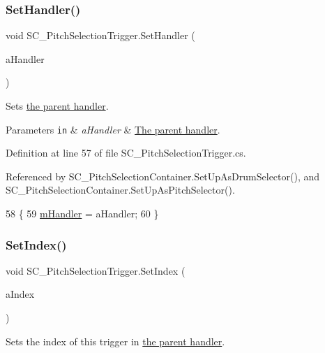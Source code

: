 \subsubsection{\texorpdfstring{Set\+Handler()}{SetHandler()}}
{\footnotesize\ttfamily void S\+C\+\_\+\+Pitch\+Selection\+Trigger.\+Set\+Handler (\begin{DoxyParamCaption}\item[{\hyperlink{class_s_c___pitch_selection_container}{S\+C\+\_\+\+Pitch\+Selection\+Container}}]{a\+Handler }\end{DoxyParamCaption})}



Sets \hyperlink{group___doc_s_c___p_s_c}{the parent handler}. 


\begin{DoxyParams}[1]{Parameters}
\mbox{\tt in}  & {\em a\+Handler} & \hyperlink{group___doc_s_c___p_s_c}{The parent handler}. \\
\hline
\end{DoxyParams}


Definition at line 57 of file S\+C\+\_\+\+Pitch\+Selection\+Trigger.\+cs.



Referenced by S\+C\+\_\+\+Pitch\+Selection\+Container.\+Set\+Up\+As\+Drum\+Selector(), and S\+C\+\_\+\+Pitch\+Selection\+Container.\+Set\+Up\+As\+Pitch\+Selector().


\begin{DoxyCode}
58     \{
59         \hyperlink{group___s_c___p_s_t_priv_var_ga23cf7134e224e9718a99949979cd5078}{mHandler} = aHandler;
60     \}
\end{DoxyCode}
\mbox{\label{group___s_c___p_s_t_pub_func_ga0b4edbf9719a384aa5cf8d29d1065696}} 
\subsubsection{\texorpdfstring{Set\+Index()}{SetIndex()}}
{\footnotesize\ttfamily void S\+C\+\_\+\+Pitch\+Selection\+Trigger.\+Set\+Index (\begin{DoxyParamCaption}\item[{int}]{a\+Index }\end{DoxyParamCaption})}



Sets the index of this trigger in \hyperlink{group___doc_s_c___p_s_c}{the parent handler}. 


